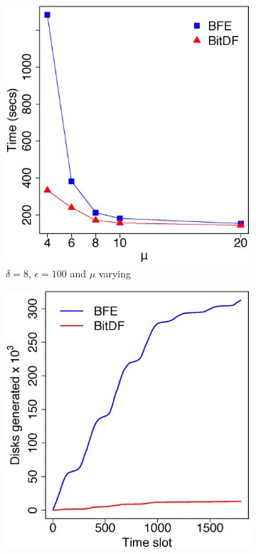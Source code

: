 {\begin{figure}[h!]
    \begin{subfigure}[t]{0.48\textwidth}
        \includegraphics[width=\textwidth]{images/TDrive_l_8_g_100_varying_n.eps}
        \caption{$\delta = 8$, $\epsilon = 100$ and $\mu$ varying}
        \label{fig:tdrive_vary_n}
    \end{subfigure}
    \begin{subfigure}[t]{0.48\textwidth}
        \includegraphics[width=\textwidth]{images/TDrive_d.eps}

\end{subfigure}
\end{figure}}
